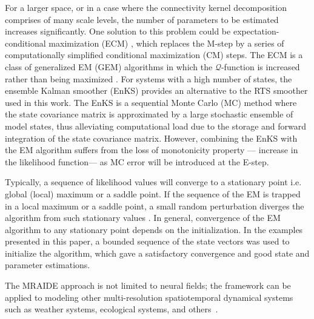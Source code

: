 \documentclass[review,authoryear,3p]{elsarticle}
\newcommand{\parham}[1]{\textcolor{red}{#1}}
\begin{document}
For a larger space, or in a case where the connectivity kernel decomposition comprises of  many scale levels, the number of parameters to be estimated increases significantly. One solution to this problem could be expectation-conditional maximization (ECM) \citep{Meng1993,Meng1994}, which replaces the M-step by a series of computationally simplified conditional maximization (CM) steps. The ECM is a class of generalized EM (GEM)  algorithms in which the $\mathcal{Q}$-function is increased rather than being maximized \citep{Fessler1994}. For systems with a high number of states, the ensemble Kalman smoother (EnKS) \citep{Evensen2003,Evensen2009a,Evensen2009} provides an alternative to the RTS smoother used in this work. The EnKS is a sequential Monte Carlo (MC) method where the state covariance matrix is approximated by a large stochastic ensemble of model states, thus alleviating computational load due to the storage and forward integration of the state covariance matrix. However, combining the EnKS with the EM algorithm suffers from the loss of monotonicity property --- increase in the likelihood function--- as MC error will be introduced at the E-step.

Typically, a sequence of likelihood values will converge to a stationary point i.e. global (local) maximum or a saddle point. If the sequence of the EM is trapped in a local maximum or a saddle point, a small random perturbation diverges the algorithm from such stationary values \citep{McLachlan1997}. In general, convergence of the EM algorithm to any stationary point depends on the initialization. In the examples presented in this paper, a bounded sequence of the state vectors was used to initialize the algorithm, which gave a satisfactory convergence and good state and parameter estimations.


The MRAIDE approach is not limited to neural fields; the framework can be applied to modeling other multi-resolution spatiotemporal dynamical systems such as weather systems, ecological systems, and others~\citep{Wikle2002,Xu2005}. 
\end{document}
